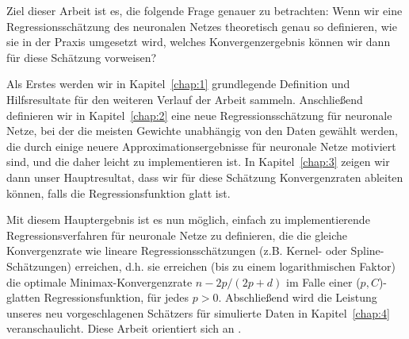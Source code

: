 Ziel dieser Arbeit ist es, die folgende Frage genauer zu betrachten: Wenn wir eine Regressionsschätzung des neuronalen Netzes theoretisch genau so definieren, wie sie in der Praxis umgesetzt wird, welches Konvergenzergebnis können wir dann für diese Schätzung vorweisen? 

Als Erstes werden wir in Kapitel~\ref{chap:1} grundlegende Definition und Hilfsresultate für den weiteren Verlauf der Arbeit sammeln.
Anschließend definieren wir in Kapitel~\ref{chap:2} eine neue Regressionsschätzung für neuronale Netze, bei der die meisten Gewichte unabhängig von den Daten gewählt werden, die durch einige neuere Approximationsergebnisse für neuronale Netze motiviert sind, und die daher leicht zu implementieren ist. In Kapitel~\ref{chap:3} zeigen wir dann unser Hauptresultat, dass wir für diese Schätzung Konvergenzraten ableiten können, falls die Regressionsfunktion glatt ist. 

Mit diesem Hauptergebnis ist es nun möglich, einfach zu implementierende Regressionsverfahren für neuronale Netze zu definieren, die die gleiche Konvergenzrate wie lineare Regressionsschätzungen (z.B. Kernel- oder Spline-Schätzungen) erreichen, d.h. sie erreichen (bis zu einem logarithmischen Faktor) die optimale Minimax-Konvergenzrate $n-2p/(2p+d)$ im Falle einer ($p,C$)-glatten Regressionsfunktion, für jedes $p > 0$.
Abschließend wird die Leistung unseres neu vorgeschlagenen Schätzers für simulierte Daten in Kapitel~\ref{chap:4} veranschaulicht. Diese Arbeit orientiert sich an \cite{kohler19}.
